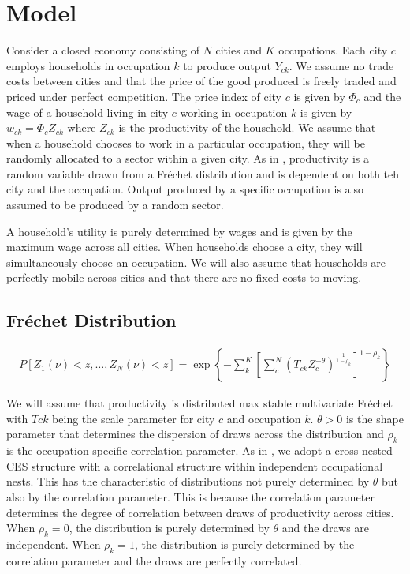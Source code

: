 \documentclass[10pt]{article}
\begin{document}
\section{Model}

Consider a closed economy consisting of $N$ cities and $K$ occupations. Each city $c$ employs households in occupation $k$ to produce output $Y_{ck}$. We assume no trade costs between cities and that the price of the good produced is freely traded and priced under perfect competition. The price index of city $c$ is given by $\Phi_c$ and the wage of a household living in city $c$ working in occupation $k$ is given by $w_{ck} = \Phi_c Z_{ck}$ where $Z_{ck}$ is the productivity of the household. We assume that when a household chooses to work in a particular occupation, they will be randomly allocated to a sector within a given city. As in \cite{ek}, productivity is a random variable drawn from a Fr\'{e}chet distribution and is dependent on both teh city and the occupation. Output produced by a specific occupation is also assumed to be produced by a random sector.

A household's utility is purely determined by wages and is given by the maximum wage across all cities. When households choose a city, they will simultaneously choose an occupation. We will also assume that households are perfectly mobile across cities and that there are no fixed costs to moving.

\subsection{Fr\'{e}chet Distribution}

\begin{align}
    P[Z_1(\nu) < z, \dots, Z_N(\nu) < z] = \exp \left\{ - \sum_{k}^{K} \left[ \sum_{c}^{N} (T_{ck} Z_c^{- \theta})^{\frac{1}{1 - \rho_k}} \right]^{1 - \rho_k} \right\}
\end{align}

We will assume that productivity is distributed max stable multivariate Fr\'{e}chet with $T{ck}$ being the scale parameter for city $c$ and occupation $k$. $\theta > 0$ is the shape parameter that determines the dispersion of draws across the distribution and $\rho_k$ is the occupation specific correlation parameter. As in \cite{lindandramondo}, we adopt a cross nested CES structure with a correlational structure within independent occupational nests. This has the characteristic of distributions not purely determined by $\theta$ but also by the correlation parameter. This is because the correlation parameter determines the degree of correlation between draws of productivity across cities. When $\rho_k = 0$, the distribution is purely determined by $\theta$ and the draws are independent. When $\rho_k = 1$, the distribution is purely determined by the correlation parameter and the draws are perfectly correlated.
\end{document}
